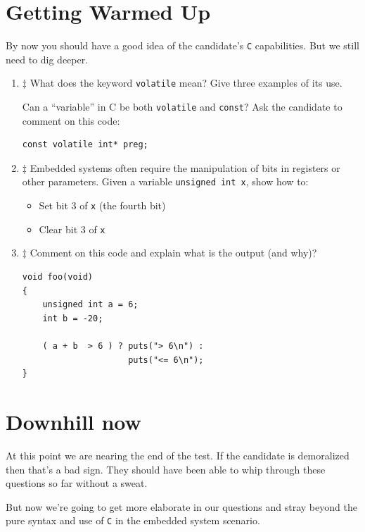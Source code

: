 \documentclass[12pt]{article}
\begin{document}
\section{Getting Warmed Up}

By now you should have a good idea of the candidate's {\texttt{C}} capabilities.
But we still need to dig deeper.
\par
\begin{enumerate}
\item $\ddagger$ What does the keyword {\texttt{volatile}} mean?  Give three examples
of its use.

Can a ``variable'' in C be both {\texttt{volatile}}
and {\texttt{const}}?
Ask the candidate to comment on this code:
\begin{lstlisting}
const volatile int* preg;
\end{lstlisting}

\item $\ddagger$ Embedded systems often require the manipulation of bits in
registers or other parameters.  Given a variable 
{\texttt{unsigned int x}}, show how to:
  \begin{itemize}
    \item Set bit 3 of {\texttt{x}} (the fourth bit)
    \item Clear bit 3 of {\texttt{x}}
  \end{itemize}

\item $\ddagger$ Comment on this code and explain what is the output (and why)?

\begin{lstlisting}
void foo(void)
{
    unsigned int a = 6;
    int b = -20;
    
    ( a + b  > 6 ) ? puts("> 6\n") :
                     puts("<= 6\n");
}
\end{lstlisting}

\end{enumerate}

\section{Downhill now}

At this point we are nearing the end of the test.  If the candidate
is demoralized then that's a bad sign. They should have been able
to whip through these questions so far without a sweat.

But now we're going to get more elaborate in our questions and stray
beyond the pure syntax and use of {\texttt{C}} in the embedded system
scenario.
\end{document}

